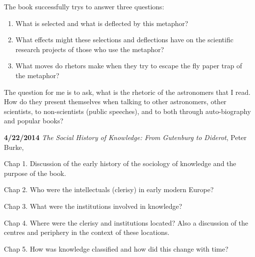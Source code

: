The book successfully trys to answer three questions:
\begin{enumerate}
  \item What is selected and what is deflected by this metaphor?
  \item What effects might these selections and deflections have on the
scientific research projects of those who use the metaphor?
  \item What moves do rhetors make when they try to escape the fly
paper trap of the metaphor?
\end{enumerate}

The question for me is to ask, what is the rhetoric of the astronomers
that I read.  How do they present themselves when talking to other
astronomers, other scientists, to non-scientists (public speeches),
and to both through auto-biography and popular books?


{\bf 4/22/2014}
{\it The Social History of Knowledge: From Gutenburg to Diderot},
Peter Burke, \cite{Burke2000}

Chap 1. Discussion of the early history of the sociology of knowledge
and the purpose of the book.

Chap 2. Who were the intellectuals (clerisy) in early modern Europe?

Chap 3. What were the institutions involved in knowledge?

Chap 4. Where were the clerisy and institutions located? Also a discussion
of the centres and periphery in the context of these locations.

Chap 5. How was knowledge classified and how did this change with time?
